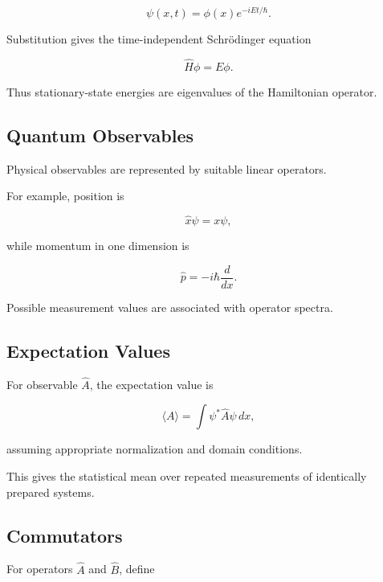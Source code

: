 \[
\boxed{
\psi(x,t)
=
\phi(x)e^{-iEt/\hbar}.
}
\]

Substitution gives the time-independent Schrödinger equation

\[
\boxed{
\hat H\phi
=
E\phi.
}
\]

Thus stationary-state energies are eigenvalues of the Hamiltonian operator.

\subsection{Quantum Observables}
\label{subsec:quantum-observables}

Physical observables are represented by suitable linear operators.

For example, position is

\[
\boxed{
\hat{x}\psi
=
x\psi,
}
\]

while momentum in one dimension is

\[
\boxed{
\hat{p}
=
-i\hbar\frac{d}{dx}.
}
\]

Possible measurement values are associated with operator spectra.

\subsection{Expectation Values}
\label{subsec:quantum-expectation-values}

For observable \(\hat A\), the expectation value is

\[
\boxed{
\langle A\rangle
=
\int
\psi^*
\hat A
\psi
\,dx,
}
\]

assuming appropriate normalization and domain conditions.

This gives the statistical mean over repeated measurements of identically
prepared systems.

\subsection{Commutators}
\label{subsec:quantum-commutators}

For operators \(\hat A\) and \(\hat B\), define

